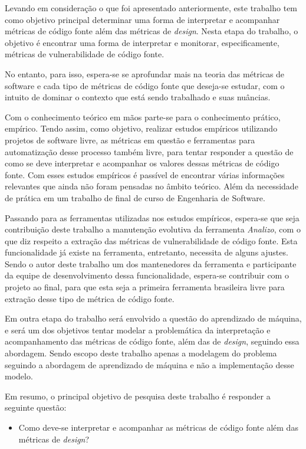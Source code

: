 Levando em consideração o que foi apresentado anteriormente, este trabalho tem
como objetivo principal determinar uma forma de interpretar e acompanhar
métricas de código fonte além das métricas de \textit{design}. Nesta
etapa do trabalho, o objetivo é encontrar uma forma de interpretar e monitorar,
especificamente, métricas de vulnerabilidade de código fonte.

No entanto, para isso, espera-se se aprofundar mais na teoria das métricas de
software e cada tipo de métricas de código fonte que deseja-se estudar, com o 
intuito de dominar o contexto que está sendo trabalhado e suas nuâncias.

Com o conhecimento teórico em mãos parte-se para o conhecimento prático,
empírico. Tendo assim, como objetivo, realizar estudos empíricos utilizando 
projetos de software livre, as métricas em questão e ferramentas para 
automatização desse processo também livre, para tentar responder a questão de 
como se deve interpretar e acompanhar os valores dessas métricas de código fonte.
Com esses estudos empíricos é passível de encontrar várias informações relevantes
que ainda não foram pensadas no âmbito teórico. Além da necessidade de prática
em um trabalho de final de curso de Engenharia de Software.

Passando para as ferramentas utilizadas nos estudos empíricos, espera-se que
seja contribuição deste trabalho a manutenção evolutiva da ferramenta
\emph{Analizo}, com o que diz respeito a extração das métricas de
vulnerabilidade de código fonte. Esta funcionalidade já existe na ferramenta,
entretanto, necessita de alguns ajustes. Sendo o autor deste trabalho um dos
mantenedores da ferramenta e participante da equipe de desenvolvimento dessa
funcionalidade, espera-se contribuir com o projeto ao final, para que esta seja
a primeira ferramenta brasileira livre para extração desse tipo de métrica de 
código fonte.

Em outra etapa do trabalho será envolvido a questão do aprendizado de máquina, e
será um dos objetivos tentar modelar a problemática da interpretação e
acompanhamento das métricas de código fonte, além das de \textit{design},
seguindo essa abordagem. Sendo escopo deste trabalho apenas a modelagem do
problema seguindo a abordagem de aprendizado de máquina e não a implementação
desse modelo.

Em resumo, o principal objetivo de pesquisa deste trabalho é responder a
seguinte questão:

\begin{itemize}
  \item Como deve-se interpretar e acompanhar as métricas de código fonte além 
    das métricas de \textit{design}?
\end{itemize}



